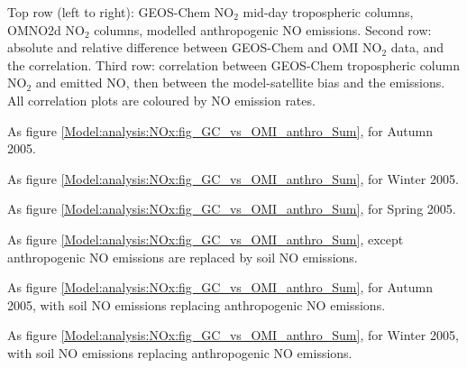     
    {
      Top row (left to right): GEOS-Chem NO$_2$ mid-day tropospheric columns, OMNO2d NO$_2$ columns, modelled anthropogenic NO emissions. 
      Second row: absolute and relative difference between GEOS-Chem and OMI NO$_2$ data, and the correlation.
      Third row: correlation between GEOS-Chem tropospheric column NO$_2$ and emitted NO, then between the model-satellite bias and the emissions.
      All correlation plots are coloured by NO emission rates.
    }
    {\label{Model:analysis:NOx:fig_GC_vs_OMI_anthro_Sum}}
    
    {As figure \ref{Model:analysis:NOx:fig_GC_vs_OMI_anthro_Sum}, for Autumn 2005.}
    {\label{Model:analysis:NOx:fig_GC_vs_OMI_anthro_Aut}}
    
    {As figure \ref{Model:analysis:NOx:fig_GC_vs_OMI_anthro_Sum}, for Winter 2005.}
    {\label{Model:analysis:NOx:fig_GC_vs_OMI_anthro_Win}}
    
    {As figure \ref{Model:analysis:NOx:fig_GC_vs_OMI_anthro_Sum}, for Spring 2005.}
    {\label{Model:analysis:NOx:fig_GC_vs_OMI_anthro_Spr}}
    
    {As figure \ref{Model:analysis:NOx:fig_GC_vs_OMI_anthro_Sum}, except anthropogenic NO emissions are replaced by soil NO emissions.}
    {\label{Model:analysis:NOx:fig_GC_vs_OMI_soil_Sum}}
    
    {As figure \ref{Model:analysis:NOx:fig_GC_vs_OMI_anthro_Sum}, for Autumn 2005, with soil NO emissions replacing anthropogenic NO emissions.}
    {\label{Model:analysis:NOx:fig_GC_vs_OMI_soil_Aut}}
    
    {As figure \ref{Model:analysis:NOx:fig_GC_vs_OMI_anthro_Sum}, for Winter 2005, with soil NO emissions replacing anthropogenic NO emissions.}
    {\label{Model:analysis:NOx:fig_GC_vs_OMI_soil_Win}}
    
